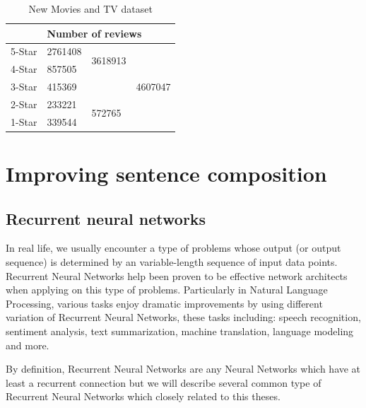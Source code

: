 \begin{table}[H]
	\centering
	\caption{New Movies and TV dataset}
	\label{table:moviereview}
	\begin{tabular}{@{}lllc@{}}
		\toprule
		& \multicolumn{3}{l}{Number of reviews}                         \\ \midrule
		5-Star & 2761408 & \multirow{2}{*}{3618913} & \multirow{5}{*}{4607047} \\ \cmidrule(r){1-2}
		4-Star & 857505  &                          &                          \\ \cmidrule(r){1-3}
		3-Star & \multicolumn{2}{l}{415369}         &                          \\ \cmidrule(r){1-3}
		2-Star & 233221  & \multirow{2}{*}{572765}  &                          \\ \cmidrule(r){1-2}
		1-Star & 339544  &                          &                          \\ \bottomrule
	\end{tabular}
\end{table}


\section{Improving sentence composition}
\subsection{Recurrent neural networks}
In real life, we usually encounter a type of problems whose output (or output sequence) is determined by an variable-length sequence of input data points. 
Recurrent Neural Networks help been proven to be effective network architects when applying on this type of problems.  
Particularly in Natural Language Processing, various tasks enjoy dramatic improvements by using different variation of Recurrent Neural Networks, these tasks including:  speech recognition\cite{speech-lstm}\cite{MiaoGM15}, sentiment analysis\cite{treeLSTM}\cite{cnn-rnn}\cite{attention-gru}, text summarization\cite{RushCW15}\cite{NallapatiXZ16}, machine translation\cite{FiratCB16}\cite{SutskeverVL14}\cite{BritzGLL17}, language modeling\cite{mikolov-nlm}\cite{JozefowiczVSSW16} and more\cite{deep-nlp}\cite{Schmidhuber14}\cite{deeplearning-book}.

By definition, Recurrent Neural Networks are any Neural Networks which have at least a recurrent connection\cite{rnn-def} but we will describe several common type of Recurrent Neural Networks which closely related to this theses.

